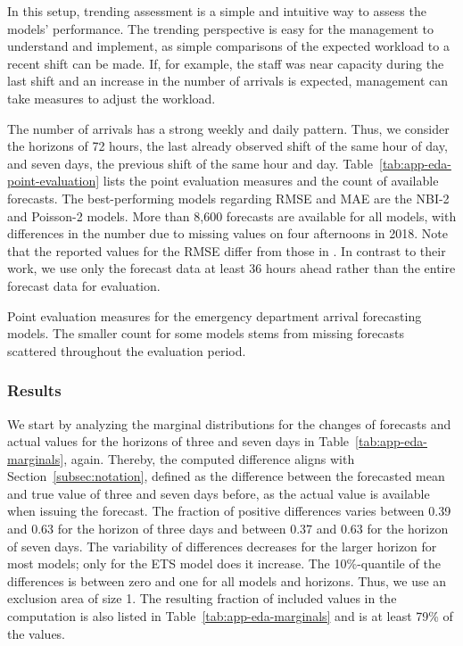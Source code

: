 \documentclass[pdflatex]{sn-jnl}
\theoremstyle{plain}%
\theoremstyle{definition}
\begin{document}
In this setup, trending assessment is a simple and intuitive way to assess the models' performance.
The trending perspective is easy for the management to understand and implement, as simple comparisons of the expected workload to a recent shift can be made.
If, for example, the staff was near capacity during the last shift and an increase in the number of arrivals is expected, management can take measures to adjust the workload.

The number of arrivals has a strong weekly and daily pattern.
Thus, we consider the horizons of 72 hours, the last already observed shift of the same hour of day, and seven days, the previous shift of the same hour and day.
Table~\ref{tab:app-eda-point-evaluation} lists the point evaluation measures and the count of available forecasts.
The best-performing models regarding RMSE and MAE are the NBI-2 and Poisson-2 models.
More than 8,600 forecasts are available for all models, with differences in the number due to missing values on four afternoons in 2018.
Note that the reported values for the RMSE differ from those in \citet{Rostami-Tabar2023}.
In contrast to their work, we use only the forecast data at least 36 hours ahead rather than the entire forecast data for evaluation.

\begin{table}
\centering

\caption[Point evaluation measures for the emergency department arrival forecasting models.]{Point evaluation measures for the emergency department arrival forecasting models. The smaller count for some models stems from missing forecasts scattered throughout the evaluation period.}\label{tab:app-eda-point-evaluation}
\end{table}


\subsubsection*{Results}

We start by analyzing the marginal distributions for the changes of forecasts and actual values for the horizons of three and seven days in Table~\ref{tab:app-eda-marginals}, again.
Thereby, the computed difference aligns with Section~\ref{subsec:notation}, defined as the difference between the forecasted mean and true value of three and seven days before, as the actual value is available when issuing the forecast.
The fraction of positive differences varies between 0.39 and 0.63 for the horizon of three days and between 0.37 and 0.63 for the horizon of seven days.
The variability of differences decreases for the larger horizon for most models; only for the ETS model does it increase.
The 10\%-quantile of the differences is between zero and one for all models and horizons.
Thus, we use an exclusion area of size 1.
The resulting fraction of included values in the computation is also listed in Table~\ref{tab:app-eda-marginals} and is at least 79\% of the values.
\end{document}
